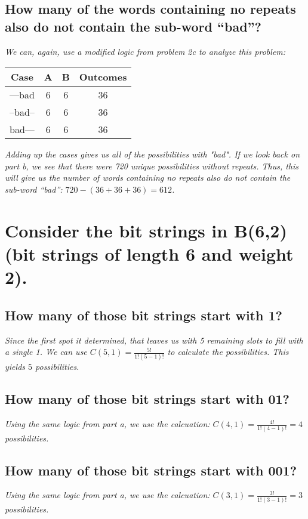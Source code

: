 \documentclass{article}
\begin{document}
\subsection{How many of the words containing no repeats also do not contain the sub-word “bad”?}
\hspace{1cm}\textit{We can, again, use a modified logic from problem 2c to analyze this problem:}
\begin{center}
     \begin{tabular}{c|c|c|c}
         Case & A & B & Outcomes \\
         \hline
         ---bad & 6 & 6 & 36 \\
         \hline
         --bad-- & 6 & 6 & 36 \\
         \hline
         bad--- & 6 & 6 & 36 \\
         \hline
     \end{tabular}
 \end{center}
 \hspace{1cm}\textit{Adding up the cases gives us all of the possibilities with "bad". If we look back
    on part b, we see that there were 720 unique possibilities without repeats. Thus, this will give us
    the number of words containing no repeats also do not contain the sub-word “bad”:
    $720-(36+36+36) = 612$.}

\section{Consider the bit strings in B(6,2) (bit strings of length 6 and weight 2).}
\subsection{How many of those bit strings start with 1?}
\hspace{1cm}\textit{Since the first spot it determined, that leaves us with 5 remaining slots to 
    fill with a single 1. We can use $C(5,1) = \frac{5!}{1!(5-1)!}$ to calculate the possibilities.
    This yields $5$ possibilities.}
\subsection{How many of those bit strings start with 01?}
\hspace{1cm}\textit{Using the same logic from part a, we use the calcuation:
    $C(4,1) = \frac{4!}{1!(4-1)!} = 4$ possibilities.}
    \clearpage
\subsection{How many of those bit strings start with 001?}
\hspace{1cm}\textit{Using the same logic from part a, we use the calcuation:
        $C(3,1) = \frac{3!}{1!(3-1)!} = 3$ possibilities.}
\end{document}
